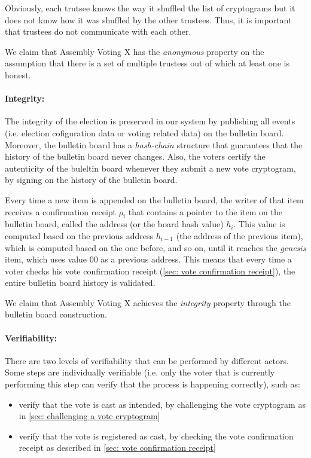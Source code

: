 Obviously, each trutsee knows the way it shuffled the list of cryptograms but it does not know how it was shuffled by the other trustees. Thus, it is important that trustees do not communicate with each other.

We claim that Assembly Voting X has the \textit{anonymous} property on the assumption that there is a set of multiple trustess out of which at least one is honest.


\paragraph{Integrity:}
The integrity of the election is preserved in our system by publishing all events (i.e. election cofiguration data or voting related data) on the bulletin board. Moreover, the bulletin board has a \textit{hash-chain} structure that guarantees that the history of the bulletin board never changes. Also, the voters certify the autenticity of the buleltin board whenever they submit a new vote cryptogram, by signing on the history of the bulletin board.

Every time a new item is appended on the bulletin board, the writer of that item receives a confirmation receipt $\rho_i$ that contains a pointer to the item on the bulletin board, called the address (or the board hash value) $h_i$. This value is computed based on the previous address $h_{i-1}$ (the address of the previous item), which is computed based on the one before, and so on, until it reaches the \textit{genesis} item, which uses value 00 as a previous address. This means that every time a voter checks his vote confirmation receipt (\ref{sec: vote confirmation receipt}), the entire bulletin board history is validated.

We claim that Assembly Voting X achieves the \textit{integrity} property through the bulletin board construction.


\paragraph{Verifiability:}
There are two levels of verifiability that can be performed by different actors. Some steps are individually verifiable (i.e. only the voter that is currently performing this step can verify that the process is happening correctly), such as:
\begin{itemize}
    \item verify that the vote is cast as intended, by challenging the vote cryptogram as in \cref{sec: challenging a vote cryptogram}
    \item verify that the vote is registered as cast, by checking the vote confirmation receipt as described in  \cref{sec: vote confirmation receipt}
\end{itemize}

